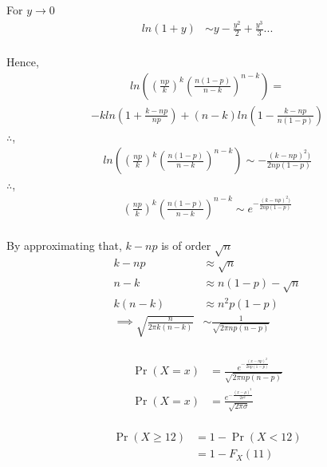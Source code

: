 \documentclass[journal,12pt,twocolumn]{IEEEtran}
\providecommand{\pr}[1]{\ensuremath{\Pr\left(#1\right)}}
\theoremstyle{remark}
\begin{document}
For \( y\to 0\)
\begin{align}
	ln(1+y) &\sim y - \frac{y^2}{2} +  \frac{y^3}{3} ...
\end{align}
\\
Hence,
\begin{align}
	ln\left(\left(\frac{np}{k}\right)^{k}\left(\frac{n(1-p)}{n-k}\right)^{n-k}\right) = 
\end{align}
\begin{align}
	-k ln\left(1 + \frac{k-np}{np}\right) + (n-k)ln\left(1 - \frac{k-np}{n(1-p)}\right)
\end{align}
$\therefore$,
\begin{align}
	ln\left(\left(\frac{np}{k}\right)^{k}\left(\frac{n(1-p)}{n-k}\right)^{n-k}\right) \sim - \frac{(k-np)^2)}{2np(1-p)}
\end{align}
$\therefore$,
\begin{align}
	\left(\frac{np}{k}\right)^{k}\left(\frac{n(1-p)}{n-k}\right)^{n-k} \sim e^{-\frac{(k-np)^2)}{2np(1-p)}}
\end{align}
\\
By approximating that, $k-np$ is of order $\sqrt{n}$
\begin{align}
	k-np &\approx \sqrt{n}\\
	n -k &\approx n(1-p) - \sqrt{n}\\
	k(n -k) &\approx n^2p(1-p)\\
	\implies
	\sqrt{\frac{n}{2\pi k (n-k)}} &\sim \frac{1}{\sqrt{2\pi np (n-p)}}
\end{align}
\\
\begin{align}
	\pr{X = x} &= \frac{e^{-\frac{(x-np)^2}{2np(1-p)}}}{\sqrt{2\pi np (n-p)}} \\
	\pr{X = x} &= \frac{e^{-\frac{(x-\mu)^2}{2\sigma^2}}}{\sqrt{2\pi\sigma}}
\end{align}
\\
\begin{align}
	\pr{X \geq 12} &= 1 - \pr{X < 12}\\
	&= 1 - F_X(11)
\end{align}
\end{document}
